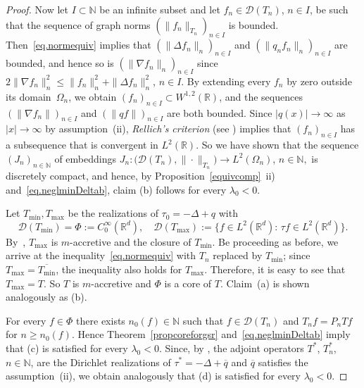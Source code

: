 \documentclass[a4paper,reqno]{amsart}
\begin{document}
\begin{proof}
Now let $I\subset{\mathbb{N}}$ be an infinite subset and let $f_n\in{\mathcal D}(T_n)$, $n\in I$, be such that 
the sequence of graph norms $(\|f_n\|_{T_n})_{n\in I}$ is  bounded. Then~\eqref{eq.normequiv} implies that $(\|\Delta f_n\|_n)_{n\in I}$ and $(\|q_nf_n\|_n)_{n\in I}$ are bounded, and hence so is $(\|\nabla f_n\|_n)_{n\in I}$ since $2\|\nabla f_n\|_n^2\leq \|f_n\|_n^2+\|\Delta f_n\|_n^2$, $n\in I.$
By extending every $f_n$ by zero outside its domain~$\Omega_n$, we obtain $(f_n)_{n\in I}\subset W^{1,2}({\mathbb{R}})$, and 
the sequences $(\|\nabla f_n\|)_{n\in I}$ and 
$(\|qf\|)_{n\in I}$ are both bounded. 
Since $|q(x)|\to\infty$ as $|x|\to\infty$ by assumption~(ii), \emph{Rellich's criterion} (see \cite[Theorem~XIII.65]{reedsimon}) implies that $(f_n)_{n\in I}$ has a subsequence that is convergent in $L^2({\mathbb{R}})$.
 So we have shown that the sequence  $(J_n)_{n\in{\mathbb{N}}}$ of embeddings $J_n:\big({\mathcal D}(T_{n}),\|\cdot\|_{T_{n}}\big)\to L^2(\Omega_n)$, $n\in{\mathbb{N}},$ is discretely compact, and hence, by Proposition~\ref{equivcomp}~ii) and~\eqref{eq.neglminDeltab}, claim (b) follows for every $\lambda_0<0$.

Let $T_{\min}, T_{\max}$ be the realizations of $\tau_0=-\Delta+q$ with 
$${\mathcal D}(T_{\min})=\Phi:=C_0^{\infty}({\mathbb{R}}^d), \quad {\mathcal D}(T_{\max}):=\{f\in L^2({\mathbb{R}}^d):\,\tau f\in L^2({\mathbb{R}}^d)\}.$$
By~\cite[Theorem~VII.2.6, Corollary~VII.2.7]{edmundsevans}, $T_{\max}$ is $m$-accretive and the closure of $T_{\min}$.
Be proceeding as before, we arrive at the inequality~\eqref{eq.normequiv} with $T_n$ replaced by $T_{\min}$;
since $T_{\max}=\overline{T_{\min}}$, the inequality also holds for $T_{\max}$.
Therefore, it is easy to see that $T_{\max}=T$. So $T$ is $m$-accretive and $\Phi$ is a core of $T$.
Claim~(a) is shown analogously as (b).

For every $f\in\Phi$ there exists $n_0(f)\in{\mathbb{N}}$ such that $f\in{\mathcal D}(T_n)$ and $T_nf=P_nTf$ for $n\geq n_0(f)$. 
Hence Theorem~\ref{propcoreforgsr} and~\eqref{eq.neglminDeltab} imply that (c) is satisfied for every $\lambda_0<0$.
Since, by \cite[Theorem~VII.2.5]{edmundsevans}, the adjoint operators $T^*$, $T_n^*$, $n\in{\mathbb{N}}$, are the Dirichlet realizations of $\tau^*=-\Delta+\overline{q}$ and $\overline{q}$ satisfies the assumption~(ii), we obtain analogously that (d) is satisfied for every $\lambda_0<0$.
\end{proof}
\end{document}
